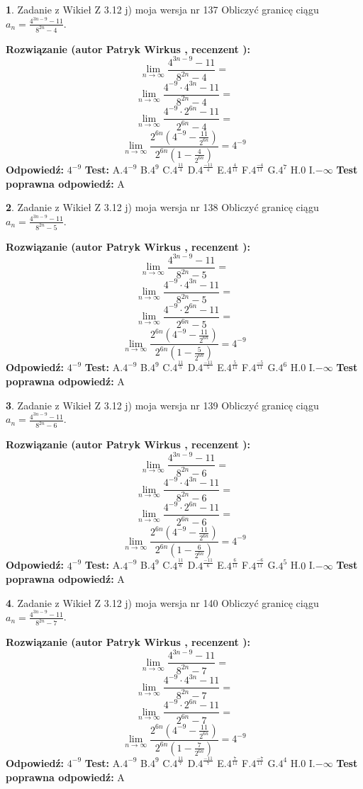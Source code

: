 \documentclass[12pt, a4paper]{article}
\theoremstyle{definition} %
\newtheorem{zad}{}
\newcommand{\zadStart}[1]{\begin{zad}#1\newline}
\newcommand{\zadStop}{\end{zad}}
\newcommand{\rozwStart}[2]{\noindent \textbf{Rozwiązanie (autor #1 , recenzent #2): }\newline}
\newcommand{\rozwStop}{\newline}
\newcommand{\odpStart}{\noindent \textbf{Odpowiedź:}\newline}
\newcommand{\odpStop}{\newline}
\newcommand{\testStart}{\noindent \textbf{Test:}\newline}
\newcommand{\testStop}{\newline}
\newcommand{\kluczStart}{\noindent \textbf{Test poprawna odpowiedź:}\newline}
\newcommand{\kluczStop}{\newline}
\begin{document}
\zadStart{Zadanie z Wikieł Z 3.12 j) moja wersja nr 137}
Obliczyć granicę ciągu $a_{n}=\frac{4^{3n-9}-11}{8^{2n}-4}$.
\zadStop
\rozwStart{Patryk Wirkus}{}
$$\lim\limits_{n\to\infty}\frac{4^{3n-9}-11}{8^{2n}-4}=$$
$$\lim\limits_{n\to\infty}\frac{4^{-9} \cdot 4^{3n}-11}{8^{2n}-4}=$$
$$\lim\limits_{n\to\infty}\frac{4^{-9} \cdot 2^{6n}-11}{2^{6n}-4}=$$
$$\lim\limits_{n\to\infty}\frac{2^{6n}(4^{-9} - \frac{11}{2^{6n}})}{2^{6n}(1-\frac{4}{2^{6n}})}= 4^{-9}$$
\rozwStop
\odpStart
$4^{-9}$
\odpStop
\testStart
A.$4^{-9}$
B.$4^{9}$
C.$4^{\frac{11}{4}}$
D.$4^{\frac{-11}{4}}$
E.$4^{\frac{4}{11}}$
F.$4^{\frac{-4}{11}}$
G.$4^{7}$
H.$0$
I.$-\infty$
\testStop
\kluczStart
A
\kluczStop



\zadStart{Zadanie z Wikieł Z 3.12 j) moja wersja nr 138}
Obliczyć granicę ciągu $a_{n}=\frac{4^{3n-9}-11}{8^{2n}-5}$.
\zadStop
\rozwStart{Patryk Wirkus}{}
$$\lim\limits_{n\to\infty}\frac{4^{3n-9}-11}{8^{2n}-5}=$$
$$\lim\limits_{n\to\infty}\frac{4^{-9} \cdot 4^{3n}-11}{8^{2n}-5}=$$
$$\lim\limits_{n\to\infty}\frac{4^{-9} \cdot 2^{6n}-11}{2^{6n}-5}=$$
$$\lim\limits_{n\to\infty}\frac{2^{6n}(4^{-9} - \frac{11}{2^{6n}})}{2^{6n}(1-\frac{5}{2^{6n}})}= 4^{-9}$$
\rozwStop
\odpStart
$4^{-9}$
\odpStop
\testStart
A.$4^{-9}$
B.$4^{9}$
C.$4^{\frac{11}{5}}$
D.$4^{\frac{-11}{5}}$
E.$4^{\frac{5}{11}}$
F.$4^{\frac{-5}{11}}$
G.$4^{6}$
H.$0$
I.$-\infty$
\testStop
\kluczStart
A
\kluczStop



\zadStart{Zadanie z Wikieł Z 3.12 j) moja wersja nr 139}
Obliczyć granicę ciągu $a_{n}=\frac{4^{3n-9}-11}{8^{2n}-6}$.
\zadStop
\rozwStart{Patryk Wirkus}{}
$$\lim\limits_{n\to\infty}\frac{4^{3n-9}-11}{8^{2n}-6}=$$
$$\lim\limits_{n\to\infty}\frac{4^{-9} \cdot 4^{3n}-11}{8^{2n}-6}=$$
$$\lim\limits_{n\to\infty}\frac{4^{-9} \cdot 2^{6n}-11}{2^{6n}-6}=$$
$$\lim\limits_{n\to\infty}\frac{2^{6n}(4^{-9} - \frac{11}{2^{6n}})}{2^{6n}(1-\frac{6}{2^{6n}})}= 4^{-9}$$
\rozwStop
\odpStart
$4^{-9}$
\odpStop
\testStart
A.$4^{-9}$
B.$4^{9}$
C.$4^{\frac{11}{6}}$
D.$4^{\frac{-11}{6}}$
E.$4^{\frac{6}{11}}$
F.$4^{\frac{-6}{11}}$
G.$4^{5}$
H.$0$
I.$-\infty$
\testStop
\kluczStart
A
\kluczStop



\zadStart{Zadanie z Wikieł Z 3.12 j) moja wersja nr 140}
Obliczyć granicę ciągu $a_{n}=\frac{4^{3n-9}-11}{8^{2n}-7}$.
\zadStop
\rozwStart{Patryk Wirkus}{}
$$\lim\limits_{n\to\infty}\frac{4^{3n-9}-11}{8^{2n}-7}=$$
$$\lim\limits_{n\to\infty}\frac{4^{-9} \cdot 4^{3n}-11}{8^{2n}-7}=$$
$$\lim\limits_{n\to\infty}\frac{4^{-9} \cdot 2^{6n}-11}{2^{6n}-7}=$$
$$\lim\limits_{n\to\infty}\frac{2^{6n}(4^{-9} - \frac{11}{2^{6n}})}{2^{6n}(1-\frac{7}{2^{6n}})}= 4^{-9}$$
\rozwStop
\odpStart
$4^{-9}$
\odpStop
\testStart
A.$4^{-9}$
B.$4^{9}$
C.$4^{\frac{11}{7}}$
D.$4^{\frac{-11}{7}}$
E.$4^{\frac{7}{11}}$
F.$4^{\frac{-7}{11}}$
G.$4^{4}$
H.$0$
I.$-\infty$
\testStop
\kluczStart
A
\kluczStop
\end{document}
